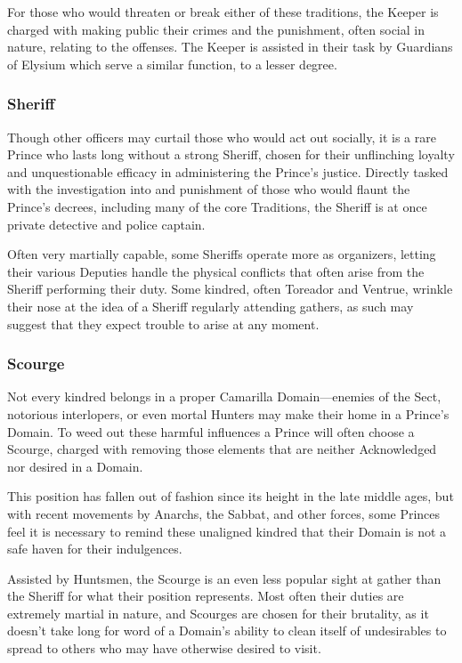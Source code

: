 For those who would threaten or break either of these traditions, the Keeper is charged with 
making public their crimes and the punishment, often social in nature, relating to the offenses.  
The Keeper is assisted in their task by Guardians of Elysium which serve a similar function, to 
a lesser degree.

\subsubsection{Sheriff}
Though other officers may curtail those who would act out socially, it is a rare Prince who 
lasts long without a strong Sheriff, chosen for their unflinching loyalty and unquestionable 
efficacy in administering the Prince's justice.  Directly tasked with the investigation into 
and punishment of those who would flaunt the Prince's decrees, including many of the core 
Traditions, the Sheriff is at once private detective and police captain.

Often very martially capable, some Sheriffs operate more as organizers, letting their various 
Deputies handle the physical conflicts that often arise from the Sheriff performing their duty.  
Some kindred, often Toreador and Ventrue, wrinkle their nose at the idea of a Sheriff regularly 
attending gathers, as such may suggest that they expect trouble to arise at any moment.

\subsubsection{Scourge}
Not every kindred belongs in a proper Camarilla Domain---enemies of the Sect, notorious 
interlopers, or even mortal Hunters may make their home in a Prince's Domain.  To weed out 
these harmful influences a Prince will often choose a Scourge, charged with removing those 
elements that are neither Acknowledged nor desired in a Domain.

This position has fallen out of fashion since its height in the late middle ages, but with 
recent movements by Anarchs, the Sabbat, and other forces, some Princes feel it is necessary 
to remind these unaligned kindred that their Domain is not a safe haven for their indulgences.

Assisted by Huntsmen, the Scourge is an even less popular sight at gather than the Sheriff for 
what their position represents.  Most often their duties are extremely martial in nature, and 
Scourges are chosen for their brutality, as it doesn't take long for word of a Domain's ability 
to clean itself of undesirables to spread to others who may have otherwise desired to visit.

